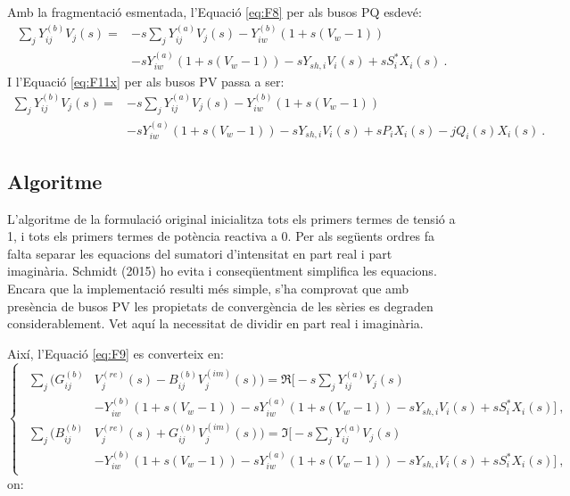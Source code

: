 Amb la fragmentació esmentada, l'Equació \ref{eq:F8} per als busos PQ esdevé:
\begin{equation}
    \begin{split}
    \sum_{j}Y^{(b)}_{ij}V_j(s) = &-s\sum_{j}Y^{(a)}_{ij}V_j(s) -Y^{(b)}_{iw}(1+s(V_w-1))\\
    &-sY^{(a)}_{iw}(1+s(V_w-1))-sY_{sh,i}V_i(s)+sS^*_iX_i(s)\ .
    \end{split}
        \label{eq:F9}
\end{equation}
I l'Equació \ref{eq:F11x} per als busos PV passa a ser:
\begin{equation}
    \begin{split}
    \sum_{j}Y^{(b)}_{ij}V_j(s) = &-s\sum_{j}Y^{(a)}_{ij}V_j(s) -Y^{(b)}_{iw}(1+s(V_w-1))\\
    &-sY^{(a)}_{iw}(1+s(V_w-1))-sY_{sh,i}V_i(s)+sP_iX_i(s)-jQ_i(s)X_i(s)\ .   
    \end{split}
        \label{eq:F9xx}
\end{equation}
\subsection{Algoritme}
L'algoritme de la formulació original inicialitza tots els primers termes de tensió a 1, i tots els primers termes de potència reactiva a 0. Per als següents ordres fa falta separar les equacions del sumatori d'intensitat en part real i part imaginària. Schmidt (2015) ho evita i conseqüentment simplifica les equacions. Encara que la implementació resulti més simple, s'ha comprovat que amb presència de busos PV les propietats de convergència de les sèries es degraden considerablement. Vet aquí la necessitat de dividir en part real i imaginària.

Així, l'Equació \ref{eq:F9} es converteix en:
\begin{equation}
    \begin{cases}
    \begin{split}
    \sum_{j}(G^{(b)}_{ij}&V^{(re)}_j(s)-B^{(b)}_{ij}V^{(im)}_j(s)) = \Re\biggl[-s\sum_{j}Y^{(a)}_{ij}V_j(s) \\
    &-Y^{(b)}_{iw}(1+s(V_w-1))-sY^{(a)}_{iw}(1+s(V_w-1))-sY_{sh,i}V_i(s)+sS^*_iX_i(s)\biggr]\ ,\\
    \sum_{j}(B^{(b)}_{ij}&V^{(re)}_j(s)+G^{(b)}_{ij}V^{(im)}_j(s)) = \Im\biggl[-s\sum_{j}Y^{(a)}_{ij}V_j(s)\\
    &-Y^{(b)}_{iw}(1+s(V_w-1))-sY^{(a)}_{iw}(1+s(V_w-1))-sY_{sh,i}V_i(s)+sS^*_iX_i(s)\biggr]\ ,
    \end{split}
\end{cases}
        \label{eq:F9PQ1}
\end{equation}
on:

